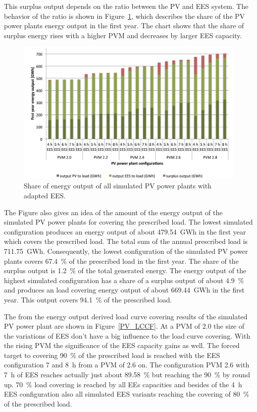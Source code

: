 This surplus output depends on the ratio between the PV and EES system. The behavior of the ratio is shown in Figure~\ref{PV_energy_output}, which describes the share of the PV power plants energy output in the first year. The chart shows that the share of surplus energy rises with a higher PVM and decreases by larger EES capacity.

\begin{figure}[htbp]  
\centering
\includegraphics[width=1\linewidth]{FIG/PV_energy_output}
\caption[Share of energy output of all simulated PV power plants with adapted EES.]{Share of energy output of all simulated PV power plants with adapted EES.}\label{PV_energy_output}
\end{figure}
The Figure also gives an idea of the amount of the energy output of the simulated PV power plants for covering the prescribed load. The lowest simulated configuration produces an energy output of about \SI{479.54}{GWh} in the first year which covers the prescribed load. The total sum of the annual prescribed load is \SI{711.75}{GWh}. Consequently, the lowest configuration of the simulated PV power plants covers 67.4~\% of the prescribed load in the first year. The share of the surplus output is 1.2~\% of the total generated energy. The energy output of the highest simulated configuration has a share of a surplus output of about 4.9~\% and produces an load covering energy output of about \SI{669.44}{GWh} in the first year. This output covers 94.1~\% of the prescribed load.

The from the energy output derived load curve covering results of the simulated PV power plant are shown in Figure~\ref{PV_LCCF}. At a PVM of 2.0 the size of the variations of EES don't have a big influence to the load curve covering. With the rising PVM the significance of the EES capacity gains as well. The forced target to covering 90~\% of the prescribed load is reached with the EES configuration 7 and \SI{8}{h} from a PVM of 2.6 on. The configuration PVM 2.6 with \SI{7}{h} of EES reaches actually just about 89.58~\% but reaching the 90~\% by round up. 70~\% load covering is reached by all EEs capacities and besides of the \SI{4}{h} EES configuration also all simulated EES variants reaching the covering of 80~\% of the prescribed load. 

